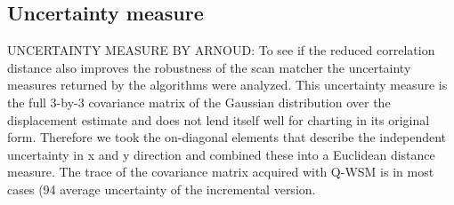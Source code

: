 \subsection{Uncertainty measure}
UNCERTAINTY MEASURE BY ARNOUD:
To see if the reduced correlation distance also improves the robustness of
the scan matcher the uncertainty measures returned by the algorithms were
analyzed. This uncertainty measure is the full 3-by-3 covariance matrix of the
Gaussian distribution over the displacement estimate and does not lend itself well
for charting in its original form. Therefore we took the on-diagonal elements that
describe the independent uncertainty in x and y direction and combined these
into a Euclidean distance measure. The trace of the covariance matrix acquired
with Q-WSM is in most cases (94%
average uncertainty of the incremental version.


